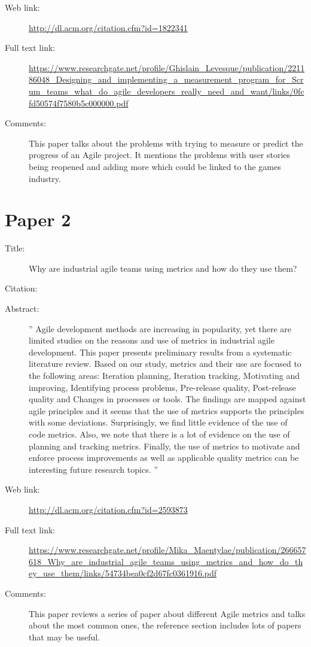 \documentclass{scrartcl}
\begin{document}
\begin{description}
	\item[Web link:] \url{http://dl.acm.org/citation.cfm?id=1822341}
	\item[Full text link:] \url{https://www.researchgate.net/profile/Ghislain_Levesque/publication/221186048_Designing_and_implementing_a_measurement_program_for_Scrum_teams_what_do_agile_developers_really_need_and_want/links/0fcfd50574f7580b5c000000.pdf}
	\item[Comments:] This paper talks about the problems with trying to measure or predict the progress of an Agile project. It mentions the problems with user stories being reopened and adding more which could be linked to the games industry. 
\end{description}

\section*{Paper 2}
\begin{description}
	\item[Title:] Why are industrial agile teams using metrics and how do they use them?
	\item[Citation:] \cite{Kupiainen}
	\item[Abstract:] '' Agile development methods are increasing in popularity, yet there are limited studies on the reasons and use of metrics in industrial agile development. This paper presents preliminary results from a systematic literature review. Based on our study, metrics and their use are focused to the following areas: Iteration planning, Iteration tracking, Motivating and improving, Identifying process problems, Pre-release quality, Post-release quality and Changes in processes or tools. The findings are mapped against agile principles and it seems that the use of metrics supports the principles with some deviations. Surprisingly, we find little evidence of the use of code metrics. Also, we note that there is a lot of evidence on the use of planning and tracking metrics. Finally, the use of metrics to motivate and enforce process improvements as well as applicable quality metrics can be interesting future research topics. ''
	\item[Web link:] \url{http://dl.acm.org/citation.cfm?id=2593873}
	\item[Full text link:] \url{https://www.researchgate.net/profile/Mika_Maentylae/publication/266657618_Why_are_industrial_agile_teams_using_metrics_and_how_do_they_use_them/links/54734bea0cf2d67fc0361916.pdf}
	\item[Comments:] This paper reviews a series of paper about different Agile metrics and talks about the most common ones, the reference section includes lots of papers that may be useful. 
\end{description}
\end{document}
